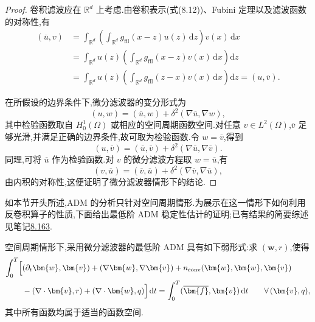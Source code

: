 \begin{proof}
卷积滤波应在 $\mathbb{R}^d$ 上考虑.由卷积表示(式(8.12))、Fubini 定理以及滤波函数的对称性,有
\[
\begin{aligned}
 (\overline{u},v)
 &=\int_{\mathbb{R}^d}
   \left(\int_{\mathbb{R}^d}
    g_{\mathrm{fil}}(x-z)u(z)\,\mathrm{d}z\right)v(x)\,\mathrm{d}x\\
 &=\int_{\mathbb{R}^d}u(z)
   \left(\int_{\mathbb{R}^d}
    g_{\mathrm{fil}}(x-z)v(x)\,\mathrm{d}x\right)\mathrm{d}z\\
 &=\int_{\mathbb{R}^d}u(z)
   \left(\int_{\mathbb{R}^d}
    g_{\mathrm{fil}}(z-x)v(x)\,\mathrm{d}x\right)\mathrm{d}z
  =(u,\overline{v}).
\end{aligned}
\]

在所假设的边界条件下,微分滤波器的变分形式为
\[
 (u,w)=(\overline{u},w)
       +\delta^2(\nabla\overline{u},\nabla w),
\]
其中检验函数取自 $H_0^1(\Omega)$ 或相应的空间周期函数空间.对任意 $v\in L^2(\Omega)$,$\overline{v}$ 足够光滑,并满足正确的边界条件,故可取为检验函数.令 $w=\overline{v}$,得到
\[
 (u,\overline{v})
 =(\overline{u},\overline{v})
  +\delta^2(\nabla\overline{u},\nabla\overline{v}).
\]
同理,可将 $\overline{u}$ 作为检验函数.对 $v$ 的微分滤波方程取 $w=\overline{u}$,有
\[
 (v,\overline{u})
 =(\overline{v},\overline{u})
  +\delta^2(\nabla\overline{v},\nabla\overline{u}),
\]
由内积的对称性,这便证明了微分滤波器情形下的结论.
\end{proof}

\begin{note}[ADM 分析]
\label{note:les-adm-analysis}
如本节开头所述,ADM 的分析只针对空间周期情形.为展示在这一情形下如何利用反卷积算子的性质,下面给出最低阶 ADM 稳定性估计的证明;已有结果的简要综述见笔记\hyperref[note:les-adm-analytical-results-survey]{8.163}.
\end{note}

\begin{note}
\label{note:les-adm-lowest-order}
空间周期情形下,采用微分滤波器的最低阶 ADM 具有如下弱形式:求 $(\bm{w},r)$,使得
\begin{equation}\label{eq:les-adm-lowest-order-weak-form}
\begin{aligned}
 \int_0^T\Bigl[
  &(\partial_t\bm{w},\bm{v})
   +(\nabla\bm{w},\nabla\bm{v})
   +n_{\mathrm{conv}}(\bm{w},\bm{w},\bm{v})\\
  &-(\nabla\cdot\bm{v},r)
   +(\nabla\cdot\bm{w},q)
 \Bigr]\,\mathrm{d}t
 =\int_0^T(\overline{\bm{f}},\bm{v})\,\mathrm{d}t
 \qquad\forall\,(\bm{v},q),
\end{aligned}
\end{equation}
其中所有函数均属于适当的函数空间.
\end{note}

